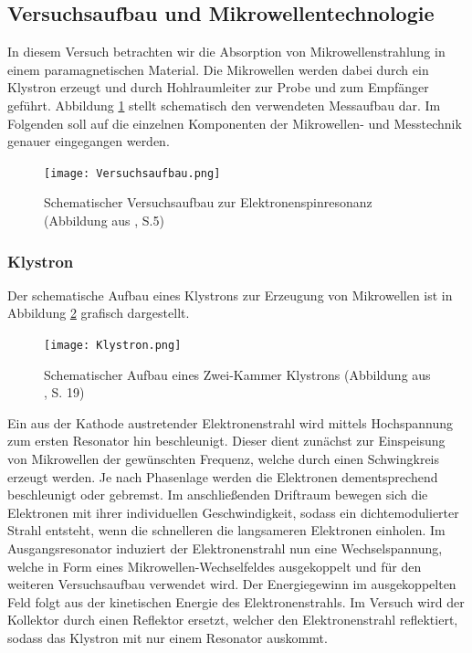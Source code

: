\documentclass{scrartcl}
\begin{document}
\subsection{Versuchsaufbau und Mikrowellentechnologie}
In diesem Versuch betrachten wir die Absorption von Mikrowellenstrahlung in einem paramagnetischen Material. Die Mikrowellen werden dabei durch ein Klystron erzeugt und durch Hohlraumleiter zur Probe und zum Empfänger geführt. Abbildung \ref{fig:Aufbau} stellt schematisch den verwendeten Messaufbau dar. Im Folgenden soll auf die einzelnen Komponenten der Mikrowellen- und Messtechnik genauer eingegangen werden.

\begin{figure}
    \centering
    \texttt{[image: Versuchsaufbau.png]}
    \caption{Schematischer Versuchsaufbau zur Elektronenspinresonanz (Abbildung aus \cite{Anleitung}, S.5)}
    \label{fig:Aufbau}
\end{figure}

\subsubsection{Klystron}
Der schematische Aufbau eines Klystrons zur Erzeugung von Mikrowellen ist in Abbildung \ref{fig:Klystron} grafisch dargestellt.

\begin{figure}[h!]
    \centering
    \texttt{[image: Klystron.png]}
    \caption{Schematischer Aufbau eines Zwei-Kammer Klystrons (Abbildung aus \cite{Grundlagen}, S. 19)}
    \label{fig:Klystron}
\end{figure}

Ein aus der Kathode austretender Elektronenstrahl wird mittels Hochspannung zum ersten Resonator hin beschleunigt. Dieser dient zunächst zur Einspeisung von Mikrowellen der gewünschten Frequenz, welche  durch einen Schwingkreis erzeugt werden. Je nach Phasenlage werden die Elektronen dementsprechend beschleunigt oder gebremst. Im anschließenden Driftraum bewegen sich die Elektronen mit ihrer individuellen Geschwindigkeit, sodass ein dichtemodulierter Strahl entsteht, wenn die schnelleren die langsameren Elektronen einholen. Im Ausgangsresonator induziert der Elektronenstrahl nun eine Wechselspannung, welche in Form eines Mikrowellen-Wechselfeldes ausgekoppelt und für den weiteren Versuchsaufbau verwendet wird. Der Energiegewinn im ausgekoppelten Feld folgt aus der kinetischen Energie des Elektronenstrahls. Im Versuch wird der Kollektor durch einen Reflektor ersetzt, welcher den Elektronenstrahl reflektiert, sodass das Klystron mit nur einem Resonator auskommt.
\end{document}
